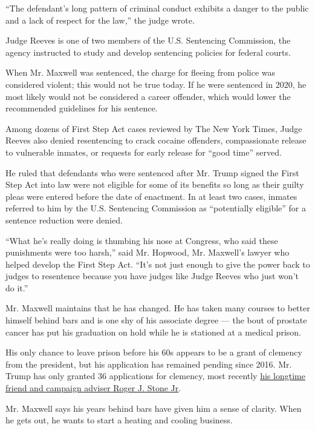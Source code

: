 ``The defendant's long pattern of criminal conduct exhibits a danger to
the public and a lack of respect for the law,'' the judge wrote.

Judge Reeves is one of two members of the U.S. Sentencing Commission,
the agency instructed to study and develop sentencing policies for
federal courts.

When Mr. Maxwell was sentenced, the charge for fleeing from police was
considered violent; this would not be true today. If he were sentenced
in 2020, he most likely would not be considered a career offender, which
would lower the recommended guidelines for his sentence.

Among dozens of First Step Act cases reviewed by The New York Times,
Judge Reeves also denied resentencing to crack cocaine offenders,
compassionate release to vulnerable inmates, or requests for early
release for ``good time'' served.

He ruled that defendants who were sentenced after Mr. Trump signed the
First Step Act into law were not eligible for some of its benefits so
long as their guilty pleas were entered before the date of enactment. In
at least two cases, inmates referred to him by the U.S. Sentencing
Commission as ``potentially eligible'' for a sentence reduction were
denied.

``What he's really doing is thumbing his nose at Congress, who said
these punishments were too harsh,'' said Mr. Hopwood, Mr. Maxwell's
lawyer who helped develop the First Step Act. ``It's not just enough to
give the power back to judges to resentence because you have judges like
Judge Reeves who just won't do it.''

Mr. Maxwell maintains that he has changed. He has taken many courses to
better himself behind bars and is one shy of his associate degree ---
the bout of prostate cancer has put his graduation on hold while he is
stationed at a medical prison.

His only chance to leave prison before his 60s appears to be a grant of
clemency from the president, but his application has remained pending
since 2016. Mr. Trump has only granted 36 applications for clemency,
most recently
\href{https://www.nytimes.com/2020/07/10/us/politics/trump-roger-stone-clemency.html}{his
longtime friend and campaign adviser Roger J. Stone Jr}.

Mr. Maxwell says his years behind bars have given him a sense of
clarity. When he gets out, he wants to start a heating and cooling
business.

